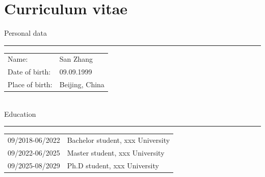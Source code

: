 \documentclass[12pt,openright]{book}
\begin{document}
\listoffigures

\listoftables

\chapter*{Curriculum vitae}

\noindent Personal data

\noindent\rule{\textwidth}{0.4pt}

\vskip 0.1in

\begin{tabular}{p{}p{}}
  Name: & San Zhang \\
  Date of birth: & 09.09.1999 \\
  Place of birth: & Beijing, China \\
\end{tabular} \\

\noindent Education

\noindent\rule{\textwidth}{0.4pt}

\vskip 0.1in

\begin{tabular}{p{}p{}}
  09/2018-06/2022 & Bachelor student, xxx University \\
  09/2022-06/2025 & Master student, xxx University \\
  09/2025-08/2029 & Ph.D student, xxx University \\
\end{tabular} \\
\end{document}
